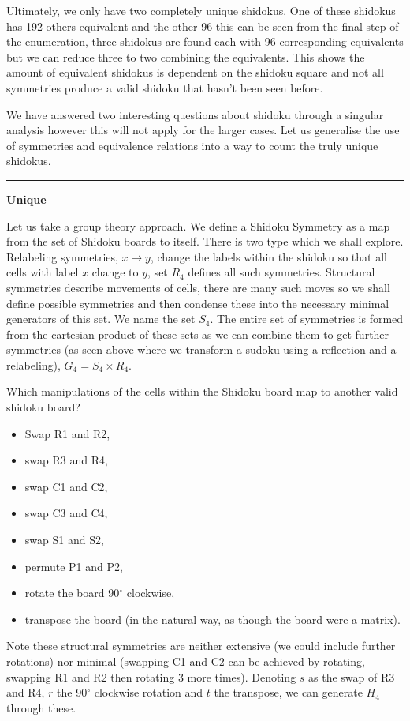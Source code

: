 \documentclass[a4paper,11pt]{report}
\begin{document}
{Ultimately, we only have two completely unique shidokus. One of these shidokus has 192 others equivalent and the other 96 this can be seen from the final step of the enumeration, three shidokus are found each with 96 corresponding equivalents but we can reduce three to two combining the equivalents. This shows the amount of equivalent shidokus is dependent on the shidoku square and not all symmetries produce a valid shidoku that hasn't been seen before.

We have answered two interesting questions about shidoku through a singular analysis however this will not apply for the larger cases. Let us generalise the use of symmetries and equivalence relations into a way to count the truly unique shidokus.

\noindent\rule{4cm}{0.4pt}

\textbf{Unique}

Let us take a group theory approach. We define a Shidoku Symmetry as a map from the set of Shidoku boards to itself. There is two type which we shall explore. Relabeling symmetries, $x\mapsto y$, change the labels within the shidoku so that all cells with label $x$ change to $y$, set $R_4$ defines all such symmetries. Structural symmetries describe movements of cells, there are many such moves so we shall define possible symmetries and then condense these into the necessary minimal generators of this set. We name the set $S_4$. The entire set of symmetries is formed from the cartesian product of these sets as we can combine them to get further symmetries (as seen above where we transform a sudoku using a reflection and a relabeling), $G_4=S_4\times R_4$.

Which manipulations of the cells within the Shidoku board map to another valid shidoku board? 
\begin{itemize}
\item Swap R1 and R2,
\item swap R3 and R4,
\item swap C1 and C2,
\item swap C3 and C4,
\item swap S1 and S2,
\item permute P1 and P2,
\item rotate the board 90$^\circ$ clockwise,
\item transpose the board (in the natural way, as though the board were a matrix).
\end{itemize}
Note these structural symmetries are neither extensive (we could include further rotations) nor minimal (swapping C1 and C2 can be achieved by rotating, swapping R1 and R2 then rotating 3 more times). Denoting $s$ as the swap of R3 and R4, $r$ the 90$^\circ$ clockwise rotation and $t$ the transpose, we can generate $H_4$ through these.

}
\end{document}
